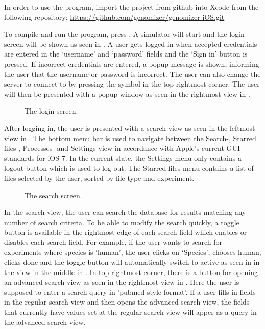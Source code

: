 In order to use the program, import the project from github into Xcode from the following repository:
\url{https://github.com/genomizer/genomizer-iOS.git} 

To compile and run the program, press . A simulator will start and the login screen will be shown as seen in . A user gets logged in when accepted credentials are entered in the ‘username’ and ‘password’ fields and the ‘Sign in’ button is pressed. If incorrect credentials are entered, a popup message is shown, informing the user that the username or password is incorrect. The user can also change  the server to connect to by pressing the symbol in the top rightmost corner. The user will then be presented with a popup window as seen in the rightmost view in .

\begin{figure}[ht]
\caption{The login screen.}
\label{fig:ios_login}
\end{figure}
\FloatBarrier
After logging in, the user is presented with a search view as seen in the leftmost view in . The bottom menu bar is used to navigate between the Search-, Starred files-, Processes- and Settings-view in accordance with Apple's current GUI standards for iOS 7. In the current state, the Settings-menu only contains a logout button which is used to log out. The Starred files-menu contains a list of files selected by the user, sorted by file type and experiment.
\begin{figure}[ht]
\caption{The search screen.}
\label{fig:ios_search}
\end{figure}
\FloatBarrier
In the search view, the user can search the database for results matching any number of search criteria. To be able to modify the search quickly, a toggle button is available in the rightmost edge of each search field which enables or disables each search field. For example, if the user wants to search for experiments where species is ‘human’, the user clicks on ‘Species’, chooses human, clicks done and the toggle button will automatically switch to active as seen in in the view in the middle in .
In top rightmost corner, there is a button for opening an advanced search view as seen in the rightmost view in . Here the user is supposed to enter a search query in ’pubmed-style-format’. If a user fills in fields in the regular search view and then opens the advanced search view, the fields that currently have values set at the regular search view will apper as a query in the advanced search view.


